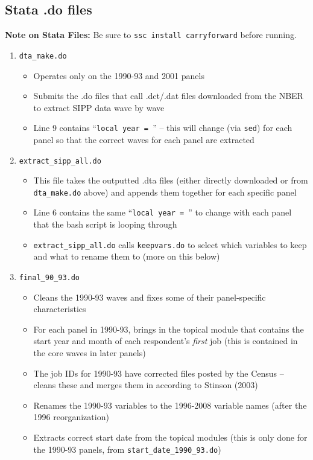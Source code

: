 \documentclass{article}
\begin{document}
\subsection{Stata .do files}
{\bf Note on Stata Files:} Be sure to {\tt ssc install carryforward} before running.
\begin{enumerate}
\item {\tt dta\_make.do}
	\begin{itemize}
	\item Operates only on the 1990-93 and 2001 panels
	\item Submits the .do files that call .dct/.dat files downloaded from the NBER to extract SIPP data wave by wave
	\item Line 9 contains ``{\tt local year = }'' -- this will change (via {\tt sed}) for each panel so that the correct waves for each panel are extracted
	\end{itemize}
\item {\tt extract\_sipp\_all.do}
	\begin{itemize}
	\item This file takes the outputted .dta files (either directly downloaded or from {\tt dta\_make.do} above) and appends them together for each specific panel
	\item Line 6 contains the same ``{\tt local year = }'' to change with each panel that the bash script is looping through
	\item {\tt extract\_sipp\_all.do} calls {\tt keepvars.do} to select which variables to keep and what to rename them to (more on this below)
	\end{itemize}
\item {\tt final\_90\_93.do}
	\begin{itemize}
	\item Cleans the 1990-93 waves and fixes some of their panel-specific characteristics
	\item For each panel in 1990-93, brings in the topical module that contains the start year and month of each respondent's {\it first} job (this is contained in the core waves in later panels)
	\item The job IDs for 1990-93 have corrected files posted by the Census -- cleans these and merges them in according to Stinson (2003)
	\item Renames the 1990-93 variables to the 1996-2008 variable names (after the 1996 reorganization)
	\item Extracts correct start date from the topical modules (this is only done for the 1990-93 panels, from {\tt start\_date\_1990\_93.do})

\end{itemize}
\end{enumerate}
\end{document}
